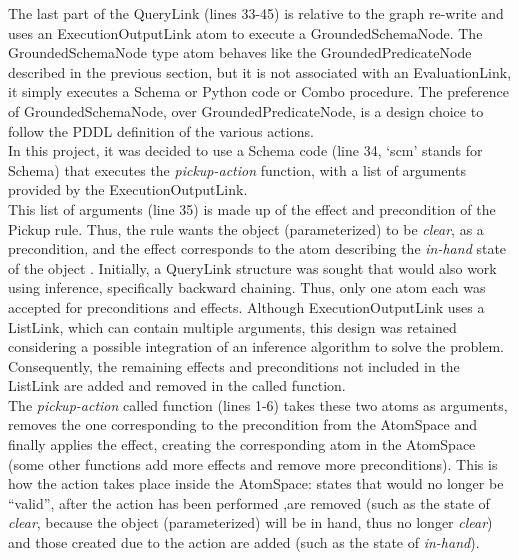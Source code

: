 The last part of the QueryLink (lines 33-45) is relative to the graph re-write and uses an ExecutionOutputLink atom to execute a GroundedSchemaNode. The GroundedSchemaNode type atom behaves like the GroundedPredicateNode described in the previous section, but it is not associated with an EvaluationLink, it simply executes a Schema or Python code or Combo procedure. The preference of GroundedSchemaNode, over GroundedPredicateNode, is a design choice to follow the PDDL definition of the various actions. \\
In this project, it was decided to use a Schema code (line 34, `scm' stands for Schema) that executes the \textit{pickup-action} function, with a list of arguments provided by the ExecutionOutputLink. \\
This list of arguments (line 35) is made up of the effect and precondition of the Pickup rule. Thus, the rule wants the object (parameterized) to be \textit{clear}, as a precondition, and the effect corresponds to the atom describing the \textit{in-hand} state of the object . 
Initially, a QueryLink structure was sought that would also work using inference, specifically backward chaining. Thus, only one atom each was accepted for preconditions and effects. Although ExecutionOutputLink uses a ListLink, which can contain multiple arguments, this design was retained considering a possible integration of an inference algorithm to solve the problem. Consequently, the remaining effects and preconditions not included in the ListLink are added and removed in the called function. \\
The \textit{pickup-action} called function (lines 1-6) takes these two atoms as arguments, removes the one corresponding to the precondition from the AtomSpace and finally applies the effect, creating the corresponding atom in the AtomSpace (some other functions add more effects and remove more preconditions). This is how the action takes place inside the AtomSpace: states that would no longer be \enquote{valid}, after the action has been performed ,are removed (such as the state of \textit{clear}, because the object (parameterized) will be in hand, thus no longer \textit{clear}) and those created due to the action are added (such as the state of \textit{in-hand}). \\

